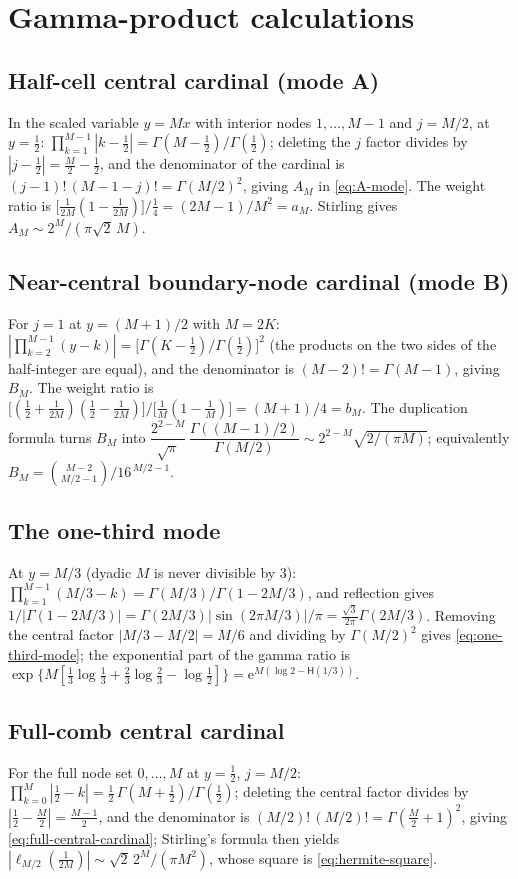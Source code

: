 \documentclass[11pt,oneside]{article}
\numberwithin{equation}{section}
\theoremstyle{definition}
\theoremstyle{remark}
\newcommand{\e}{\mathrm e}
\newcommand{\abs}[1]{\left\lvert #1\right\rvert}
\newcommand{\Hyp}{\mathsf H}
\begin{document}
\appendix

\section{Gamma-product calculations}
\label{app:gamma}

\subsection{Half-cell central cardinal (mode A)}
In the scaled variable $y=Mx$ with interior nodes $1,\dots,M-1$ and
$j=M/2$, at $y=\tfrac12$:
$\prod_{k=1}^{M-1}\abs{k-\tfrac12}=\Gamma(M-\tfrac12)/\Gamma(\tfrac12)$;
deleting the $j$ factor divides by $\abs{j-\tfrac12}=\tfrac M2-\tfrac12$,
and the denominator of the cardinal is
$(j-1)!\,(M-1-j)!=\Gamma(M/2)^{2}$, giving $A_M$ in
\eqref{eq:A-mode}.  The weight ratio is
$\bigl[\tfrac1{2M}(1-\tfrac1{2M})\bigr]/\tfrac14=(2M-1)/M^{2}=a_M$.
Stirling gives $A_M\sim2^{M}/(\pi\sqrt2\,M)$.

\subsection{Near-central boundary-node cardinal (mode B)}
For $j=1$ at $y=(M+1)/2$ with $M=2K$:
$\abs{\prod_{k=2}^{M-1}(y-k)}
=\bigl[\Gamma(K-\tfrac12)/\Gamma(\tfrac12)\bigr]^{2}$
(the products on the two sides of the half-integer are equal), and
the denominator is $(M-2)!=\Gamma(M-1)$, giving $B_M$.  The weight
ratio is
$\bigl[(\tfrac12+\tfrac1{2M})(\tfrac12-\tfrac1{2M})\bigr]
/\bigl[\tfrac1M(1-\tfrac1M)\bigr]=(M+1)/4=b_M$.  The duplication
formula turns $B_M$ into
$\dfrac{2^{2-M}}{\sqrt\pi}\,
\dfrac{\Gamma((M-1)/2)}{\Gamma(M/2)}
\sim2^{2-M}\sqrt{2/(\pi M)}$; equivalently
$B_M=\binom{M-2}{M/2-1}\big/16^{\,M/2-1}$.

\subsection{The one-third mode}
At $y=M/3$ (dyadic $M$ is never divisible by $3$):
$\prod_{k=1}^{M-1}(M/3-k)=\Gamma(M/3)/\Gamma(1-2M/3)$, and reflection
gives $1/\abs{\Gamma(1-2M/3)}
=\Gamma(2M/3)\abs{\sin(2\pi M/3)}/\pi
=\tfrac{\sqrt3}{2\pi}\Gamma(2M/3)$.  Removing the central factor
$\abs{M/3-M/2}=M/6$ and dividing by $\Gamma(M/2)^{2}$ gives
\eqref{eq:one-third-mode}; the exponential part of the gamma ratio is
$\exp\{M[\tfrac13\log\tfrac13+\tfrac23\log\tfrac23-\log\tfrac12]\}
=\e^{M(\log2-\Hyp(1/3))}$.

\subsection{Full-comb central cardinal}
For the full node set $0,\dots,M$ at $y=\tfrac12$, $j=M/2$:
$\prod_{k=0}^{M}\abs{\tfrac12-k}
=\tfrac12\,\Gamma(M+\tfrac12)/\Gamma(\tfrac12)$; deleting the
central factor divides by $\abs{\tfrac12-\tfrac M2}=\tfrac{M-1}2$,
and the denominator is
$(M/2)!\,(M/2)!=\Gamma(\tfrac M2+1)^{2}$, giving
\eqref{eq:full-central-cardinal}; Stirling's formula then yields
$\abs{\ell_{M/2}(\tfrac1{2M})}\sim\sqrt2\,2^{M}/(\pi M^{2})$, whose
square is \eqref{eq:hermite-square}.
\end{document}
